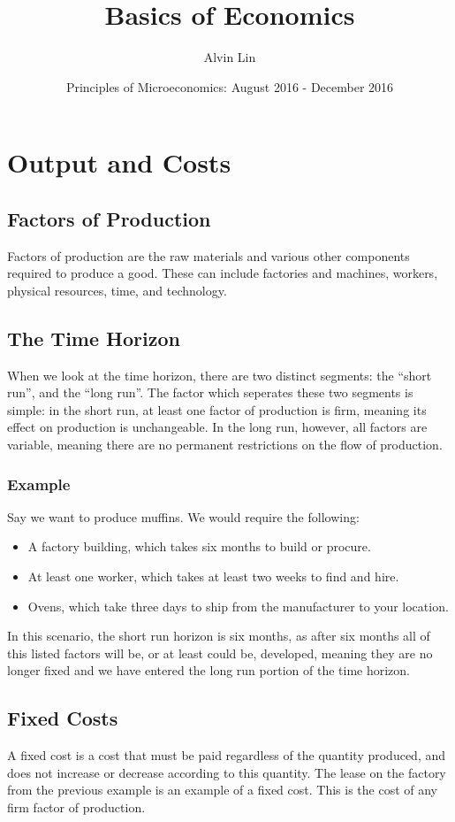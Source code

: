 \documentclass{article}
\title{Basics of Economics}
\author{Alvin Lin}
\date{Principles of Microeconomics: August 2016 - December 2016}
\begin{document}
\maketitle

\section{Output and Costs}

\subsection{Factors of Production}
Factors of production are the raw materials and various other components
required to produce a good. These can include factories and machines, workers,
physical resources, time, and technology.

\subsection{The Time Horizon}
When we look at the time horizon, there are two distinct segments: the ``short
run'', and the ``long run''. The factor which seperates these two segments is
simple: in the short run, at least one factor of production is firm, meaning
its effect on production is unchangeable. In the long run, however, all factors
are variable, meaning there are no permanent restrictions on the flow of
production.

\subsubsection{Example}
Say we want to produce muffins. We would require the following:
\begin{itemize}
  \item A factory building, which takes six months to build or procure.
  \item At least one worker, which takes at least two weeks to find and hire.
  \item Ovens, which take three days to ship from the manufacturer to your
        location.
\end{itemize}
In this scenario, the short run horizon is six months, as after six months
all of this listed factors will be, or at least could be, developed, meaning
they are no longer fixed and we have entered the long run portion of the
time horizon.

\subsection{Fixed Costs}
A fixed cost is a cost that must be paid regardless of the quantity produced,
and does not increase or decrease according to this quantity. The lease on
the factory from the previous example is an example of a fixed cost. This is
the cost of any firm factor of production.
\end{document}
